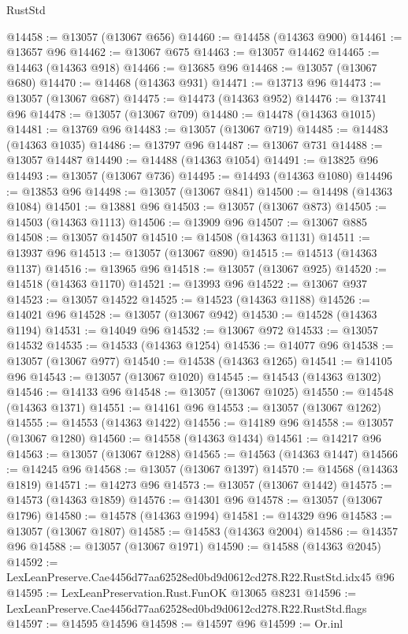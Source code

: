 \begin{lexlean}{RustStd}
\begin{coremodule}
@14458 := @13057 (@13067 @656)
@14460 := @14458 (@14363 @900)
@14461 := @13657 @96
@14462 := @13067 @675
@14463 := @13057 @14462
@14465 := @14463 (@14363 @918)
@14466 := @13685 @96
@14468 := @13057 (@13067 @680)
@14470 := @14468 (@14363 @931)
@14471 := @13713 @96
@14473 := @13057 (@13067 @687)
@14475 := @14473 (@14363 @952)
@14476 := @13741 @96
@14478 := @13057 (@13067 @709)
@14480 := @14478 (@14363 @1015)
@14481 := @13769 @96
@14483 := @13057 (@13067 @719)
@14485 := @14483 (@14363 @1035)
@14486 := @13797 @96
@14487 := @13067 @731
@14488 := @13057 @14487
@14490 := @14488 (@14363 @1054)
@14491 := @13825 @96
@14493 := @13057 (@13067 @736)
@14495 := @14493 (@14363 @1080)
@14496 := @13853 @96
@14498 := @13057 (@13067 @841)
@14500 := @14498 (@14363 @1084)
@14501 := @13881 @96
@14503 := @13057 (@13067 @873)
@14505 := @14503 (@14363 @1113)
@14506 := @13909 @96
@14507 := @13067 @885
@14508 := @13057 @14507
@14510 := @14508 (@14363 @1131)
@14511 := @13937 @96
@14513 := @13057 (@13067 @890)
@14515 := @14513 (@14363 @1137)
@14516 := @13965 @96
@14518 := @13057 (@13067 @925)
@14520 := @14518 (@14363 @1170)
@14521 := @13993 @96
@14522 := @13067 @937
@14523 := @13057 @14522
@14525 := @14523 (@14363 @1188)
@14526 := @14021 @96
@14528 := @13057 (@13067 @942)
@14530 := @14528 (@14363 @1194)
@14531 := @14049 @96
@14532 := @13067 @972
@14533 := @13057 @14532
@14535 := @14533 (@14363 @1254)
@14536 := @14077 @96
@14538 := @13057 (@13067 @977)
@14540 := @14538 (@14363 @1265)
@14541 := @14105 @96
@14543 := @13057 (@13067 @1020)
@14545 := @14543 (@14363 @1302)
@14546 := @14133 @96
@14548 := @13057 (@13067 @1025)
@14550 := @14548 (@14363 @1371)
@14551 := @14161 @96
@14553 := @13057 (@13067 @1262)
@14555 := @14553 (@14363 @1422)
@14556 := @14189 @96
@14558 := @13057 (@13067 @1280)
@14560 := @14558 (@14363 @1434)
@14561 := @14217 @96
@14563 := @13057 (@13067 @1288)
@14565 := @14563 (@14363 @1447)
@14566 := @14245 @96
@14568 := @13057 (@13067 @1397)
@14570 := @14568 (@14363 @1819)
@14571 := @14273 @96
@14573 := @13057 (@13067 @1442)
@14575 := @14573 (@14363 @1859)
@14576 := @14301 @96
@14578 := @13057 (@13067 @1796)
@14580 := @14578 (@14363 @1994)
@14581 := @14329 @96
@14583 := @13057 (@13067 @1807)
@14585 := @14583 (@14363 @2004)
@14586 := @14357 @96
@14588 := @13057 (@13067 @1971)
@14590 := @14588 (@14363 @2045)
@14592 := LexLeanPreserve.Cae4456d77aa62528ed0bd9d0612cd278.R22.RustStd.idx45 @96
@14595 := LexLeanPreservation.Rust.FunOK @13065 @8231
@14596 := LexLeanPreserve.Cae4456d77aa62528ed0bd9d0612cd278.R22.RustStd.flags
@14597 := @14595 @14596
@14598 := @14597 @96
@14599 := Or.inl

\end{coremodule}
\end{lexlean}
